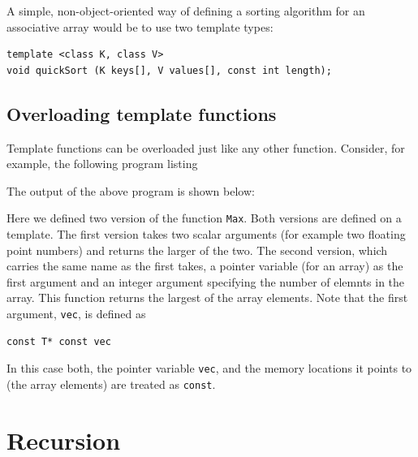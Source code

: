 A simple, non-object-oriented way of defining a sorting algorithm for an associative
array would be to use two template types:
{\small \begin{verbatim}
template <class K, class V>
void quickSort (K keys[], V values[], const int length);
\end{verbatim}}


\subsection{Overloading template functions}

Template functions can be overloaded just like any other function.
Consider, for example, the following program listing

\noindent {\small }

The output of the above program is shown below:


\noindent
Here we defined two version of the function \verb+Max+. Both
versions are defined on a template.
The first version takes two scalar arguments (for example
two floating point numbers) and returns the larger of the
two. The second version, which carries the same name as
the first takes, a pointer variable (for an array) as the
first argument and an integer argument specifying the number
of elemnts in the array. This function returns the largest
of the array elements.
Note that the first argument, \verb+vec+, is defined as
{\small \begin{verbatim}
const T* const vec
\end{verbatim}}
\noindent
In this case both, the pointer variable \verb+vec+, and the
memory locations it points to (the array elements) are treated
 as \verb+const+.


\section{Recursion}

